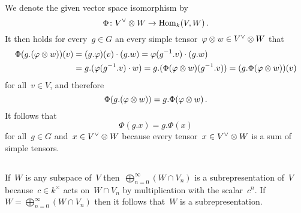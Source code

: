 We denote the given vector space isomorphism by
\[
          \Phi
  \colon  V^\vee \otimes W
  \to     \operatorname{Hom}_k(V,W) \,.
\]
It then holds for every~$g \in G$ an every simple tensor~$\varphi \otimes w \in V^\vee \otimes W$ that
\begin{align*}
      \Phi(g.(\varphi \otimes w))(v)
  &=  (g.\varphi)(v) \cdot (g.w)
   =  \varphi(g^{-1}.v) \cdot (g.w) \\
  &=  g.(\varphi(g^{-1}.v) \cdot w)
   =  g.( \Phi(\varphi \otimes w)(g^{-1}.v) )
   =  (g.\Phi(\varphi \otimes w))(v)
\end{align*}
for all~$v \in V$, and therefore
\[
    \Phi(g.(\varphi \otimes w))
  = g.\Phi(\varphi \otimes w) \,.
\]
It follows that
\[
    \Phi(g.x)
  = g.\Phi(x)
\]
for all~$g \in G$ and~$x \in V^\vee \otimes W$ because every tensor~$x \in V^\vee \otimes W$ is a sum of simple tensors.





\subsection{}

If~$W$ is any subspace of~$V$ then~$\bigoplus_{n=0}^\infty (W \cap V_n)$ is a subrepresentation of~$V$ because~$c \in k^\times$ acts on~$W \cap V_n$ by multiplication with the scalar~$c^n$.
If~$W = \bigoplus_{n=0}^\infty (W \cap V_n)$ then it follows that~$W$ is a subrepresentation.

